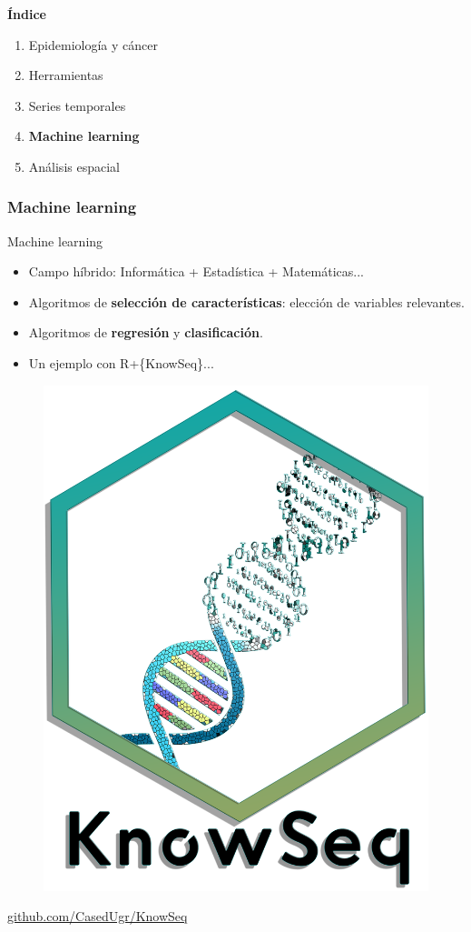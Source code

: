 \documentclass{beamer}
\begin{document}
\begin{frame}\frametitle{}
	
	\Large{\textbf{Índice}}\\[2ex]
	\normalsize
	\begin{enumerate}
		\item Epidemiología y cáncer\\[2ex]
		\item Herramientas\\[2ex]
		\item Series temporales \\[2ex]
		\item \textbf{Machine learning}  \\[2ex]
		\item Análisis espacial \\[2ex]
	\end{enumerate}
	
\end{frame}


\begin{frame}\frametitle{Machine learning}
	
	\begin{block}{Machine learning}
		\begin{itemize}
			\item Campo híbrido: Informática + Estadística + Matemáticas... \\[2ex]
			\item Algoritmos de \textbf{selección de características}: elección de variables relevantes.\\[2ex]
			\item Algoritmos de \textbf{regresión} y \textbf{clasificación}.\\[2ex]
			\item Un ejemplo con R+\{KnowSeq\}...
		\end{itemize}
		\begin{figure}
			\centering
			\includegraphics[width=.15\textwidth]{images/06_logo_knowseq.png}			
		\end{figure}
		\vspace{-10pt}
		\centering
		\url{github.com/CasedUgr/KnowSeq}
	\end{block}
	
\end{frame}
\end{document}
